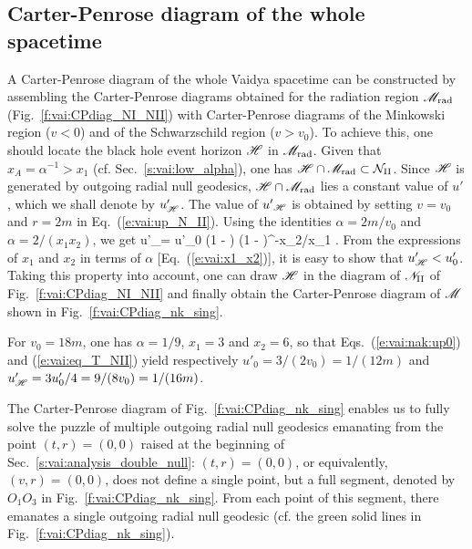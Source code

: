 \subsection{Carter-Penrose diagram of the whole spacetime}

A Carter-Penrose diagram of the whole Vaidya spacetime can be constructed
by assembling the Carter-Penrose diagrams obtained for the radiation region
$\mathscr{M}_{\rm rad}$ (Fig.~\ref{f:vai:CPdiag_NI_NII}) with Carter-Penrose diagrams of the Minkowski
region ($v<0$) and of the Schwarzschild region ($v> v_0$).
To achieve this, one should locate the black hole event horizon $\mathscr{H}$
in $\mathscr{M}_{\rm rad}$.
Given that $x_A = \alpha^{-1} >  x_1$ (cf. Sec.~\ref{s:vai:low_alpha}),
one has $\mathscr{H}\cap \mathscr{M}_{\rm rad} \subset
\mathcal{N}_{\rm II}$.
Since $\mathscr{H}$ is generated by outgoing radial
null geodesics, $\mathscr{H}\cap \mathscr{M}_{\rm rad}$ lies a constant value of $u'$, which
we shall denote by $u'_{\mathscr{H}}$. The value of ${u'}_{\mathscr{H}}$ is obtained by
setting $v=v_0$ and $r=2m$ in Eq.~(\ref{e:vai:up_N_II}). Using the identities
$\alpha = 2m/v_0$ and $\alpha = 2/(x_1 x_2)$, we get
\be \label{e:vai:nak:upH}
    u'_\Hor = u'_0 \left(1 -  \right)
    \left(1 -  \right)^{-x_2/x_1} .
\ee
From the expressions of $x_1$ and $x_2$ in terms of $\alpha$
[Eq.~(\ref{e:vai:x1_x2})], it is easy to show that $u'_{\mathscr{H}} < u'_0$.
Taking this property into account, one can draw $\mathscr{H}$ in the diagram of $\mathscr{N}_{\rm II}$
of Fig.~\ref{f:vai:CPdiag_NI_NII} and finally obtain
the Carter-Penrose diagram of $\mathscr{M}$ shown in
Fig.~\ref{f:vai:CPdiag_nk_sing}.

\begin{example}
For $v_0 = 18 m$, one has $\alpha = 1/9$, $x_1 = 3$ and $x_2 = 6$, so that Eqs.~(\ref{e:vai:nak:up0})
and (\ref{e:vai:eq_T_NII}) yield respectively
$u'_0 = 3/(2 v_0) = 1/(12 m)$ and
$u'_{\mathscr{H}} = 3 u'_0 / 4=  9/(8 v_0) = 1/(16 m)$.
\end{example}

The Carter-Penrose diagram of Fig.~\ref{f:vai:CPdiag_nk_sing} enables us to fully solve the puzzle of multiple outgoing radial null geodesics emanating from the point $(t,r) = (0,0)$ raised at the beginning of
Sec.~\ref{s:vai:analysis_double_null}: $(t,r) = (0,0)$, or equivalently, $(v, r) = (0,0)$,
does not define a single point, but a full segment, denoted by $O_1 O_3$ in Fig.~\ref{f:vai:CPdiag_nk_sing}. From each point of this segment, there emanates a single outgoing radial null geodesic (cf. the green solid lines in Fig.~\ref{f:vai:CPdiag_nk_sing}).

